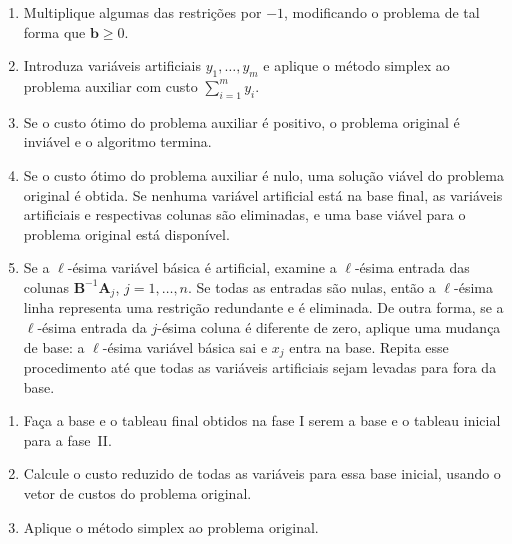 \documentclass[12pt,a4paper]{article}
\newcommand{\vet}{\mathbf}                                   %
\begin{document}
\vspace{-0.2cm}
\begin{enumerate}
	\item Multiplique algumas das restrições por $-1$, modificando o problema de tal forma que  
	$\vet{b} \geq 0$.
	\item Introduza variáveis artificiais $y_1, \ldots, y_m$ e aplique o método simplex ao problema
	auxiliar com custo $\sum_{i=1}^{m}y_i$.
	\item Se o custo ótimo do problema auxiliar é positivo, o problema original é inviável e o 
	algoritmo termina.
	\item Se o custo ótimo do problema auxiliar é nulo, uma solução viável do problema original é 
	obtida. Se nenhuma variável artificial está na base final, as variáveis artificiais e respectivas
	colunas são eliminadas, e uma base viável para o problema original está disponível.
	\item Se a $\ell$-ésima variável básica é artificial, examine a $\ell$-ésima entrada das
	colunas $\vet{B}^{-1}\vet{A}_j$, $j = 1, \ldots, n$. Se todas as entradas são nulas, então a 
	$\ell$-ésima linha representa uma restrição redundante e é eliminada. De outra forma, se a 
	$\ell$-ésima entrada da $j$-ésima coluna é diferente de zero, aplique uma mudança de base:
	a $\ell$-ésima variável básica sai e $x_j$ entra na base. Repita esse procedimento até que todas 
	as variáveis artificiais sejam levadas para fora da base.
\end{enumerate}

\vspace{-0.2cm}
\begin{enumerate}
	\item Faça a base e o tableau final obtidos na fase I serem a base e o tableau inicial para a 
	fase~II.
	\item Calcule o custo reduzido de todas as variáveis para essa base inicial, usando o vetor de 
	custos do problema original.
	\item Aplique o método simplex ao problema original.
\end{enumerate}
\end{document}
